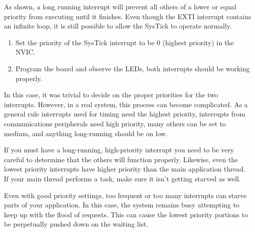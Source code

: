 \documentclass[11pt,fleqn]{book} %
\begin{document}
As shown, a long running interrupt will prevent all others of a lower or equal priority from executing until it finishes. Even though the EXTI interrupt contains an infinite loop, it is still possible to allow the SysTick to operate normally. 

\begin{enumerate}
    \item Set the priority of the SysTick interrupt to be 0 (highest priority) in the NVIC.
    \item Program the board and observe the LEDs, both interrupts should be working properly.
\end{enumerate}

In this case, it was trivial to decide on the proper priorities for the two interrupts. However, in a real system, this process can become complicated. As a general rule interrupts used for timing need the highest priority, interrupts from communications peripherals need high priority, many others can be set to medium, and anything long-running should be on low. 

If you must have a long-running, high-priority interrupt you need to be very careful to determine that the others will function properly. Likewise, even the lowest priority interrupts have higher priority than the main application thread. If your main thread performs a task, make sure it isn't getting starved as well. 

Even with good priority settings, too frequent or too many interrupts can starve parts of your application. In this case, the system remains busy attempting to keep up with the flood of requests. This can cause the lowest priority portions to be perpetually pushed down on the waiting list.
\end{document}
